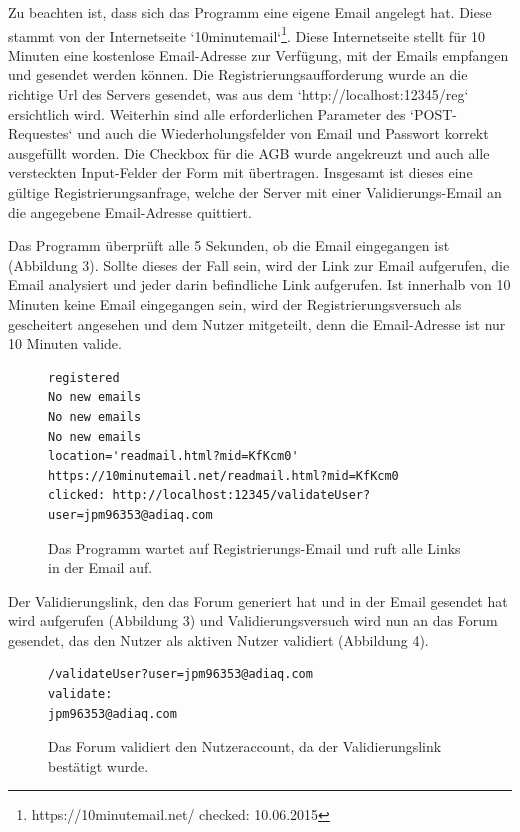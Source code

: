 Zu beachten ist, dass sich das Programm eine eigene Email angelegt hat. Diese stammt von der Internetseite `10minutemail`\footnote{https://10minutemail.net/ checked: 10.06.2015}.
Diese Internetseite stellt für 10 Minuten eine kostenlose Email-Adresse zur Verfügung, mit der Emails empfangen und gesendet werden können. Die Registrierungsaufforderung wurde an die richtige Url des Servers gesendet, was aus dem `http://localhost:12345/reg` ersichtlich wird. Weiterhin sind alle erforderlichen Parameter des `POST-Requestes` und auch die Wiederholungsfelder von Email und Passwort korrekt ausgefüllt worden. Die Checkbox für die AGB wurde angekreuzt und auch alle versteckten Input-Felder der Form mit übertragen. Insgesamt ist dieses eine gültige Registrierungsanfrage, welche der Server mit einer Validierungs-Email an die angegebene Email-Adresse quittiert.

Das Programm überprüft alle 5 Sekunden, ob die Email eingegangen ist (Abbildung 3). Sollte dieses der Fall sein, wird der Link zur Email aufgerufen, die Email analysiert und jeder darin befindliche Link aufgerufen. Ist innerhalb von 10 Minuten keine Email eingegangen sein, wird der Registrierungsversuch als gescheitert angesehen und dem Nutzer mitgeteilt, denn die Email-Adresse ist nur 10 Minuten valide.

\begin{figure}[ht]
\begin{lstlisting}[language=HTML5]
registered
No new emails
No new emails
No new emails
location='readmail.html?mid=KfKcm0'
https://10minutemail.net/readmail.html?mid=KfKcm0
clicked: http://localhost:12345/validateUser?user=jpm96353@adiaq.com
\end{lstlisting}
\caption{Das Programm wartet auf Registrierungs-Email und ruft alle Links in der Email auf.}
\end{figure}

Der Validierungslink, den das Forum generiert hat und in der Email gesendet hat wird aufgerufen (Abbildung 3) und Validierungsversuch wird nun an das Forum gesendet, das den Nutzer als aktiven Nutzer validiert (Abbildung 4).

\begin{figure}[ht]
\begin{lstlisting}[language=HTML5]
/validateUser?user=jpm96353@adiaq.com
validate:
jpm96353@adiaq.com
\end{lstlisting}
\caption{Das Forum validiert den Nutzeraccount, da der Validierungslink bestätigt wurde.}
\end{figure}

